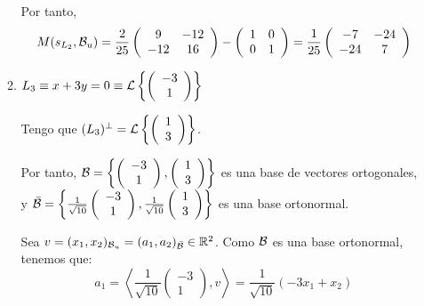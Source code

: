 \begin{ejercicio}
\begin{enumerate}
\begin{enumerate}
        Por tanto,
        \begin{equation*}
            M(s_{L_2},\mathcal{B}_u) =\frac{2}{25}\left(\begin{array}{cc}
                9 & -12 \\
                -12 & 16
            \end{array}\right) - \left(\begin{array}{cc}
                1 & 0 \\
                0 & 1
            \end{array}\right)
            = \frac{1}{25}\left(\begin{array}{cc}
                -7 & -24 \\
                -24 & 7
            \end{array}\right)
        \end{equation*}



        \item $L_3\equiv x+3y=0\equiv \mathcal{L}\left\{\left(\begin{array}{c}
             -3 \\ 1
        \end{array}\right)\right\}$

        Tengo que $(L_3)^\perp=\mathcal{L}\left\{\left(\begin{array}{c}
             1 \\ 3
        \end{array}\right)\right\}$.

        Por tanto, $\mathcal{B}=\left\{\left(\begin{array}{c}
             -3 \\ 1
        \end{array}\right), \left(\begin{array}{c}
             1 \\ 3
        \end{array}\right)\right\}$ es una base de vectores ortogonales, y 
        $\bar{\mathcal{B}}=\left\{\frac{1}{\sqrt{10}}\left(\begin{array}{c}
            -3 \\ 1
        \end{array}\right), \frac{1}{\sqrt{10}}\left(\begin{array}{c}
             1 \\ 3
        \end{array}\right)\right\}$ es una base ortonormal.

        Sea $v=(x_1,x_2)_{\mathcal{B}_u}=(a_1,a_2)_{\bar{\mathcal{B}}}\in \mathbb{R}^2$. Como $\mathcal{B}$ es una base ortonormal, tenemos que:
        \begin{equation*}
            a_1=\left\langle \frac{1}{\sqrt{10}}\left(\begin{array}{c}
             -3 \\ 1
        \end{array}\right), v\right\rangle = \frac{1}{\sqrt{10}}(-3x_1+x_2)
        \end{equation*}


\end{enumerate}
\end{enumerate}
\end{ejercicio}

